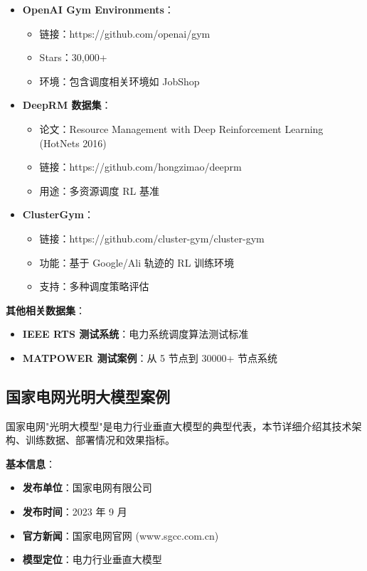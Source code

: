 \documentclass[12pt,a4paper]{article}
\begin{document}
\begin{itemize}
    \item \textbf{OpenAI Gym Environments}：
    \begin{itemize}
        \item 链接：https://github.com/openai/gym
        \item Stars：30,000+
        \item 环境：包含调度相关环境如 JobShop
    \end{itemize}
    
    \item \textbf{DeepRM 数据集}：
    \begin{itemize}
        \item 论文：Resource Management with Deep Reinforcement Learning (HotNets 2016)
        \item 链接：https://github.com/hongzimao/deeprm
        \item 用途：多资源调度 RL 基准
    \end{itemize}
    
    \item \textbf{ClusterGym}：
    \begin{itemize}
        \item 链接：https://github.com/cluster-gym/cluster-gym
        \item 功能：基于 Google/Ali 轨迹的 RL 训练环境
        \item 支持：多种调度策略评估
    \end{itemize}
\end{itemize}

\textbf{其他相关数据集}：

\begin{itemize}
    \item \textbf{IEEE RTS 测试系统}：电力系统调度算法测试标准
    \item \textbf{MATPOWER 测试案例}：从 5 节点到 30000+ 节点系统
\end{itemize}

\subsection{国家电网光明大模型案例}

国家电网"光明大模型"是电力行业垂直大模型的典型代表，本节详细介绍其技术架构、训练数据、部署情况和效果指标。

\textbf{基本信息}：

\begin{itemize}
    \item \textbf{发布单位}：国家电网有限公司
    \item \textbf{发布时间}：2023 年 9 月
    \item \textbf{官方新闻}：国家电网官网 (www.sgcc.com.cn)
    \item \textbf{模型定位}：电力行业垂直大模型
\end{itemize}
\end{document}
